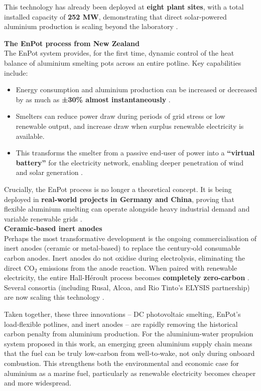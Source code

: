\documentclass[12pt]{article}
\begin{document}
This technology has already been deployed at \textbf{eight plant sites}, with a total installed capacity of \textbf{252 MW}, demonstrating that direct solar‑powered aluminium production is scaling beyond the laboratory \cite{dc-aluminium-scaling}.

\break

\textbf{The EnPot process from New Zealand} \\
The EnPot system provides, for the first time, dynamic control of the heat balance of aluminium smelting pots across an entire potline. Key capabilities include:

\begin{itemize}
\item Energy consumption and aluminium production can be increased or decreased by as much as \textbf{±30\% almost instantaneously} \cite{en-pot-basics}.
\item Smelters can reduce power draw during periods of grid stress or low renewable output, and increase draw when surplus renewable electricity is available.
\item This transforms the smelter from a passive end‑user of power into a \textbf{“virtual battery”} for the electricity network, enabling deeper penetration of wind and solar generation \cite{en-pot-basics}.
\end{itemize}

Crucially, the EnPot process is no longer a theoretical concept. It is being deployed in \textbf{real‑world projects in Germany and China}, proving that flexible aluminium smelting can operate alongside heavy industrial demand and variable renewable grids \cite{en-pot-scaling}. \\

\textbf{Ceramic‑based inert anodes} \\
Perhaps the most transformative development is the ongoing commercialisation of inert anodes (ceramic or metal‑based) to replace the century‑old consumable carbon anodes. Inert anodes do not oxidise during electrolysis, eliminating the direct CO\(_2\) emissions from the anode reaction. When paired with renewable electricity, the entire Hall-Héroult process becomes \textbf{completely zero‑carbon} \cite{aluminium-inert-anodes}. Several consortia (including Rusal, Alcoa, and Rio Tinto’s ELYSIS partnership) are now scaling this technology \cite{inert-anode-scaling}.

Taken together, these three innovations – DC photovoltaic smelting, EnPot’s load‑flexible potlines, and inert anodes – are rapidly removing the historical carbon penalty from aluminium production. For the aluminium‑water propulsion system proposed in this work, an emerging green aluminium supply chain means that the fuel can be truly low‑carbon from well‑to‑wake, not only during onboard combustion. This strengthens both the environmental and economic case for aluminium as a marine fuel, particularly as renewable electricity becomes cheaper and more widespread.
\end{document}
